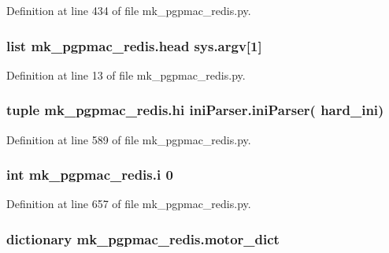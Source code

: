 Definition at line 434 of file mk\-\_\-pgpmac\-\_\-redis.\-py.

\hypertarget{namespacemk__pgpmac__redis_a760ff4955cbf5beef4ae36a28c30b01a}{
\subsubsection[{head}]{\setlength{\rightskip}{0pt plus 5cm}list mk\-\_\-pgpmac\-\_\-redis.\-head sys.\-argv\mbox{[}1\mbox{]}}}\label{namespacemk__pgpmac__redis_a760ff4955cbf5beef4ae36a28c30b01a}


Definition at line 13 of file mk\-\_\-pgpmac\-\_\-redis.\-py.

\hypertarget{namespacemk__pgpmac__redis_af0e472a4df25fc5c1660ef07226689a8}{
\subsubsection[{hi}]{\setlength{\rightskip}{0pt plus 5cm}tuple mk\-\_\-pgpmac\-\_\-redis.\-hi {\bf ini\-Parser.\-ini\-Parser}( {\bf hard\-\_\-ini})}}\label{namespacemk__pgpmac__redis_af0e472a4df25fc5c1660ef07226689a8}


Definition at line 589 of file mk\-\_\-pgpmac\-\_\-redis.\-py.

\hypertarget{namespacemk__pgpmac__redis_afa643a23a5984fe44c2182ada3dfa401}{
\subsubsection[{i}]{\setlength{\rightskip}{0pt plus 5cm}int mk\-\_\-pgpmac\-\_\-redis.\-i 0}}\label{namespacemk__pgpmac__redis_afa643a23a5984fe44c2182ada3dfa401}


Definition at line 657 of file mk\-\_\-pgpmac\-\_\-redis.\-py.

\hypertarget{namespacemk__pgpmac__redis_ad8583d4fe88c4c98af73d2858c51c660}{
\subsubsection[{motor\-\_\-dict}]{\setlength{\rightskip}{0pt plus 5cm}dictionary mk\-\_\-pgpmac\-\_\-redis.\-motor\-\_\-dict}}\label{namespacemk__pgpmac__redis_ad8583d4fe88c4c98af73d2858c51c660}


